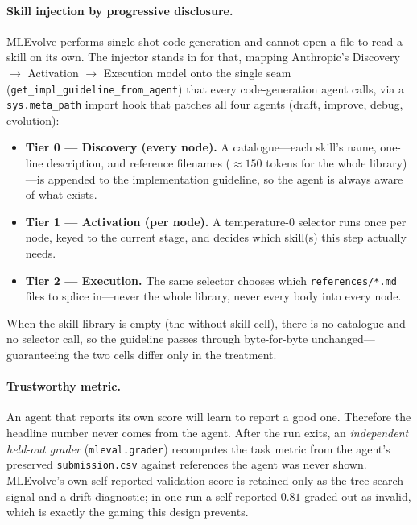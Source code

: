 \documentclass[11pt,a4paper]{article}
\begin{document}
\paragraph{Skill injection by progressive disclosure.} MLEvolve performs single-shot code
generation and cannot open a file to read a skill on its own. The injector stands in for
that, mapping Anthropic's Discovery $\rightarrow$ Activation $\rightarrow$ Execution model
onto the single seam (\texttt{get\_impl\_guideline\_from\_agent}) that every code-generation
agent calls, via a \texttt{sys.meta\_path} import hook that patches all four agents
(draft, improve, debug, evolution):
\begin{itemize}
\item \textbf{Tier 0 --- Discovery (every node).} A catalogue---each skill's name, one-line
description, and reference filenames ($\approx 150$ tokens for the whole library)---is
appended to the implementation guideline, so the agent is always aware of what exists.
\item \textbf{Tier 1 --- Activation (per node).} A temperature-0 selector runs once per node,
keyed to the current stage, and decides which skill(s) this step actually needs.
\item \textbf{Tier 2 --- Execution.} The same selector chooses which \texttt{references/*.md}
files to splice in---never the whole library, never every body into every node.
\end{itemize}
When the skill library is empty (the without-skill cell), there is no catalogue and no
selector call, so the guideline passes through byte-for-byte unchanged---guaranteeing the
two cells differ only in the treatment.

\paragraph{Trustworthy metric.} An agent that reports its own score will learn to report a
good one. Therefore the headline number never comes from the agent. After the run exits, an
\emph{independent held-out grader} (\texttt{mleval.grader}) recomputes the task metric from
the agent's preserved \texttt{submission.csv} against references the agent was never shown.
MLEvolve's own self-reported validation score is retained only as the tree-search signal and
a drift diagnostic; in one run a self-reported $0.81$ graded out as invalid, which is exactly
the gaming this design prevents.
\end{document}

